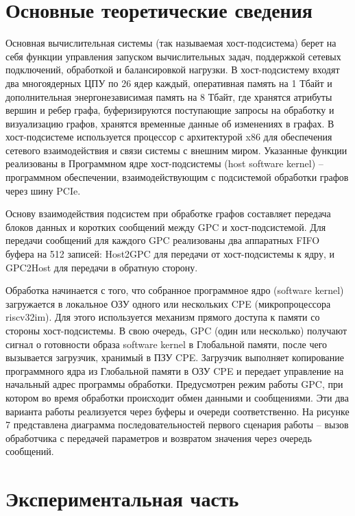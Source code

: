 \chapter{Основные теоретические сведения}
Основная вычислительная системы (так называемая хост-подсистема) берет на себя функции управления запуском вычислительных задач, поддержкой сетевых подключений, обработкой и балансировкой нагрузки. В хост-подсистему входят два многоядерных ЦПУ по 26 ядер каждый, оперативная память на 1 Тбайт и дополнительная энергонезависимая память на 8 Тбайт, где хранятся атрибуты вершин и ребер графа, буферизируются поступающие запросы на обработку и визуализацию графов, хранятся временные данные об изменениях в графах. В хост-подсистеме используется процессор с архитектурой x86 для обеспечения сетевого взаимодействия и связи системы с внешним миром. Указанные функции реализованы в Программном ядре хост-подсистемы (host software kernel) – программном обеспечении, взаимодействующим с подсистемой обработки графов через шину PCIe.

Основу взаимодействия подсистем при обработке графов составляет передача блоков данных и коротких сообщений между GPC и хост-подсистемой. Для передачи сообщений для каждого GPC реализованы два аппаратных FIFO буфера на 512 записей: Host2GPC для передачи от хост-подсистемы к ядру, и GPC2Host для передачи в обратную сторону.

Обработка начинается с того, что собранное программное ядро (software kernel) загружается в локальное ОЗУ одного или нескольких CPE (микропроцессора riscv32im). Для этого используется механизм прямого доступа к памяти со стороны хост-подсистемы. В свою очередь, GPC (один или несколько) получают сигнал о готовности образа software kernel в Глобальной памяти, после чего вызывается загрузчик, хранимый в ПЗУ CPE. Загрузчик выполняет копирование программного ядра из Глобальной памяти в ОЗУ CPE и передает управление на начальный адрес программы обработки. Предусмотрен режим работы GPC, при котором во время обработки происходит обмен данными и сообщениями. Эти два варианта работы реализуется через буферы и очереди соответственно. На рисунке 7 представлена диаграмма последовательностей первого сценария работы – вызов обработчика с передачей параметров и возвратом значения через очередь сообщений.

\chapter{Экспериментальная часть}


